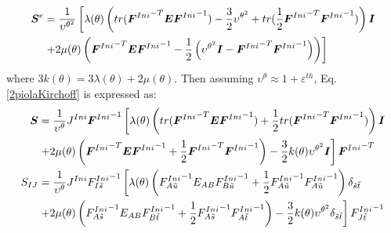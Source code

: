 \documentclass[oneside,11pt,times]{book}
\begin{document}
\begin{equation}
\begin{aligned}
\centering
\boldsymbol{S}^e &=\frac{1}{\upsilon^{\theta^2}}\left[\lambda (\theta) \left(tr({\bm{F}^{Ini}}^{-T}\bm{E}{\bm{F}^{Ini}}^{-1})-\frac{3}{2}{\upsilon^{\theta^2}}+tr(\frac{1}{2}{\bm{F}^{Ini}}^{-T}{{\bm{F}^{Ini}}^{-1}})\right)\bm{I} \right.\\ &\left.+2\mu (\theta)\left({\bm{F}^{Ini}}^{-T}\bm{E}{\bm{F}^{Ini}}^{-1}-\frac{1}{2}\left({\upsilon^{\theta^2}}\bm{I}-{\bm{F}^{Ini}}^{-T}{\bm{F}^{Ini}}^{-1}\right)\right)\right]
\end{aligned}
\label{2piolaKirchoff}
\end{equation}
where $3k(\theta)=3\lambda(\theta)+2\mu(\theta)$.
Then assuming $\upsilon^{\theta}\approx1+ \varepsilon^{th}$, Eq. \eqref{2piolaKirchoff} is expressed as:
\begin{equation}
\begin{aligned}
\centering
\boldsymbol{S} &=\frac{1}{\upsilon^{\theta}}J^{Ini}{\bm{F}^{Ini}}^{-1}\left[\lambda (\theta) \left(tr({\bm{F}^{Ini}}^{-T}\bm{E}{\bm{F}^{Ini}}^{-1})+\frac{1}{2}tr({\bm{F}^{Ini}}^{-T}{{\bm{F}^{Ini}}^{-1}})\right)\bm{I} \right.\\ &\left.+2\mu (\theta)\left({\bm{F}^{Ini}}^{-T}\bm{E}{\bm{F}^{Ini}}^{-1}+\frac{1}{2}{\bm{F}^{Ini}}^{-T}{\bm{F}^{Ini}}^{-1}\right)-\frac{3}{2}k(\theta){\upsilon^{\theta^2}}\bm{I}\right]{\bm{F}^{Ini}}^{-T}\\
S_{IJ} &=\frac{1}{\upsilon^{\theta}}J^{Ini}{{F}^{Ini}_{I\tilde{s}}}^{-1}\left[\lambda (\theta) \left({{F}^{Ini}_{A\tilde{u}}}^{-1}{E}_{AB}{{F}^{Ini}_{B\tilde{u}}}^{-1}+\frac{1}{2}{{F}^{Ini}_{A\tilde{u}}}^{-1}{{F}^{Ini}_{A\tilde{u}}}^{-1}\right)\delta_{\tilde{s}\tilde{t}}\right.\\ &\left.+2\mu (\theta)\left({{F}^{Ini}_{A\tilde{s}}}^{-1}{E}_{AB}{{F}^{Ini}_{B\tilde{t}}}^{-1}+\frac{1}{2}{{F}^{Ini}_{A\tilde{s}}}^{-1}{{F}^{Ini}_{A\tilde{t}}}^{-1}\right)-\frac{3}{2}k(\theta){\upsilon^{\theta^2}}\delta_{\tilde{s}\tilde{t}}\right]{{F}^{Ini}_{J\tilde{t}}}^{-1}
\end{aligned}
\label{2piolaKirchoffFinal}
\end{equation}
\end{document}
